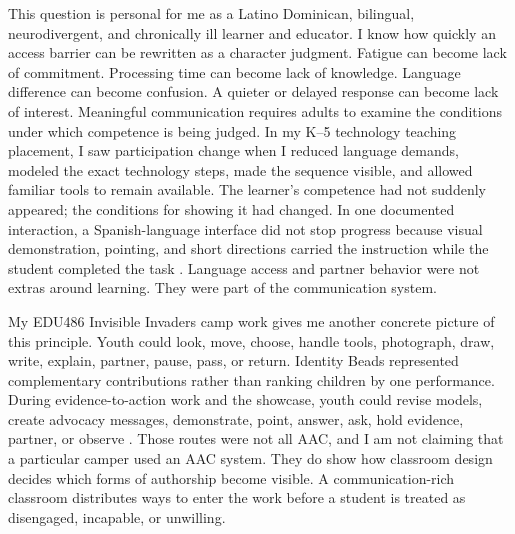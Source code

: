 
This question is personal for me as a Latino Dominican, bilingual, neurodivergent, and chronically ill learner and educator. I know how quickly an access barrier can be rewritten as a character judgment. Fatigue can become lack of commitment. Processing time can become lack of knowledge. Language difference can become confusion. A quieter or delayed response can become lack of interest. Meaningful communication requires adults to examine the conditions under which competence is being judged. In my K--5 technology teaching placement, I saw participation change when I reduced language demands, modeled the exact technology steps, made the sequence visible, and allowed familiar tools to remain available. The learner's competence had not suddenly appeared; the conditions for showing it had changed. In one documented interaction, a Spanish-language interface did not stop progress because visual demonstration, pointing, and short directions carried the instruction while the student completed the task \citep{placementEvidence2026}. Language access and partner behavior were not extras around learning. They were part of the communication system.

My EDU486 Invisible Invaders camp work gives me another concrete picture of this principle. Youth could look, move, choose, handle tools, photograph, draw, write, explain, partner, pause, pass, or return. Identity Beads represented complementary contributions rather than ranking children by one performance. During evidence-to-action work and the showcase, youth could revise models, create advocacy messages, demonstrate, point, answer, ask, hold evidence, partner, or observe \citep{campEvidence2026}. Those routes were not all AAC, and I am not claiming that a particular camper used an AAC system. They do show how classroom design decides which forms of authorship become visible. A communication-rich classroom distributes ways to enter the work before a student is treated as disengaged, incapable, or unwilling.

